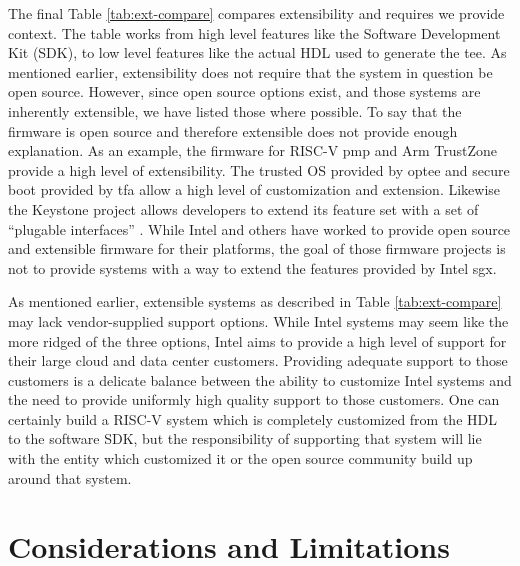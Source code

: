The final Table \ref{tab:ext-compare} compares extensibility and requires we provide context. The table works from high level features like the Software Development Kit (SDK), to low level features like the actual HDL used to generate the \gls{tee}. As mentioned earlier, extensibility does not require that the system in question be open source. However, since open source options exist, and those systems are inherently extensible, we have listed those where possible. To say that the firmware is open source and therefore extensible does not provide enough explanation. As an example, the firmware for RISC-V \gls{pmp} and Arm TrustZone provide a high level of extensibility. The trusted OS provided by \gls{optee} and secure boot provided by \gls{tfa} allow a high level of customization and extension. Likewise the Keystone project allows developers to extend its feature set with a set of ``plugable interfaces'' \cite{lee2019keystone}. While Intel and others have worked to provide open source and extensible firmware for their platforms, the goal of those firmware projects is not to provide systems with a way to extend the features provided by Intel \gls{sgx}. 

As mentioned earlier, extensible systems as described in Table \ref{tab:ext-compare} may lack vendor-supplied support options. While Intel systems may seem like the more ridged of the three options, Intel aims to provide a high level of support for their large cloud and data center customers. Providing adequate support to those customers is a delicate balance between the ability to customize Intel systems and the need to provide uniformly high quality support to those customers. One can certainly build a RISC-V system which is completely customized from the HDL to the software SDK, but the responsibility of supporting that system will lie with the entity which customized it or the open source community build up around that system.

\renewcommand{\arraystretch}{1}


\section{Considerations and Limitations}

